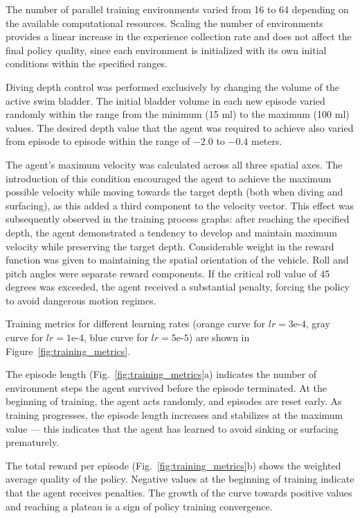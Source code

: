 \documentclass[12pt]{revtex4}
\begin{document}
The number of parallel training environments varied from 16 to 64 depending on the available computational resources. Scaling the number of environments provides a linear increase in the experience collection rate and does not affect the final policy quality, since each environment is initialized with its own initial conditions within the specified ranges.

Diving depth control was performed exclusively by changing the volume of the active swim bladder. The initial bladder volume in each new episode varied randomly within the range from the minimum (15 ml) to the maximum (100 ml) values. The desired depth value that the agent was required to achieve also varied from episode to episode within the range of $-2.0$ to $-0.4$ meters.

The agent's maximum velocity was calculated across all three spatial axes. The introduction of this condition encouraged the agent to achieve the maximum possible velocity while moving towards the target depth (both when diving and surfacing), as this added a third component to the velocity vector. This effect was subsequently observed in the training process graphs: after reaching the specified depth, the agent demonstrated a tendency to develop and maintain maximum velocity while preserving the target depth. Considerable weight in the reward function was given to maintaining the spatial orientation of the vehicle. Roll and pitch angles were separate reward components. If the critical roll value of 45 degrees was exceeded, the agent received a substantial penalty, forcing the policy to avoid dangerous motion regimes.

Training metrics for different learning rates (orange curve for $lr = 3\text{e-}4$, gray curve for $lr = 1\text{e-}4$, blue curve for $lr = 5\text{e-}5$) are shown in Figure~\ref{fig:training_metrics}.

The episode length (Fig.~\ref{fig:training_metrics}a) indicates the number of environment steps the agent survived before the episode terminated. At the beginning of training, the agent acts randomly, and episodes are reset early. As training progresses, the episode length increases and stabilizes at the maximum value --- this indicates that the agent has learned to avoid sinking or surfacing prematurely.

The total reward per episode (Fig.~\ref{fig:training_metrics}b) shows the weighted average quality of the policy. Negative values at the beginning of training indicate that the agent receives penalties. The growth of the curve towards positive values and reaching a plateau is a sign of policy training convergence.
\end{document}

